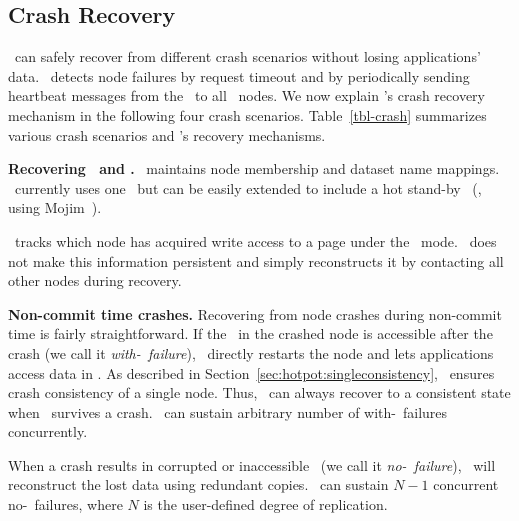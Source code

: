 \subsection{Crash Recovery}
\label{sec:hotpot:recovery}

\hotpot\ can safely recover from different crash scenarios
without losing applications' data.
\hotpot\ detects node failures
by request timeout 
and by periodically sending heartbeat messages from 
the \cd\ to all \hotpot\ nodes.
We now explain \hotpot's crash recovery mechanism
in the following four crash scenarios.
Table~\ref{tbl-crash} summarizes various crash scenarios and \hotpot's recovery mechanisms.




{\bf Recovering \cd\ and \master.}
\cd\ maintains node membership and dataset name mappings.
\hotpot\ currently uses one \cd\ but can be easily extended to 
include a hot stand-by \cd\ (\eg, using Mojim~\cite{Zhang15-Mojim}).

\master\ tracks which node has acquired write access to a page under the \mrsw\ mode.
\hotpot\ does not make this information persistent
and simply reconstructs it by contacting all other nodes during recovery.

{\bf Non-commit time crashes.}
Recovering from node crashes during non-commit time is fairly straightforward.
If the \nvm\ in the crashed node is accessible after the crash (we call it {\em with-\nvm\ failure}),
\hotpot\ directly restarts the node and
lets applications access data in \nvm.
As described in Section~\ref{sec:hotpot:singleconsistency}, \hotpot\ ensures crash consistency of a single node.
Thus, \hotpot\ can always recover to a consistent state 
when \nvm\ survives a crash.
\hotpot\ can sustain arbitrary number of with-\nvm\ failures concurrently. 

When a crash results in corrupted or inaccessible \nvm\ (we call it {\em no-\nvm\ failure}),
\hotpot\ will reconstruct the lost data using redundant copies.
\hotpot\ can sustain $N-1$ concurrent no-\nvm\ failures, where $N$ is the user-defined degree of replication.

